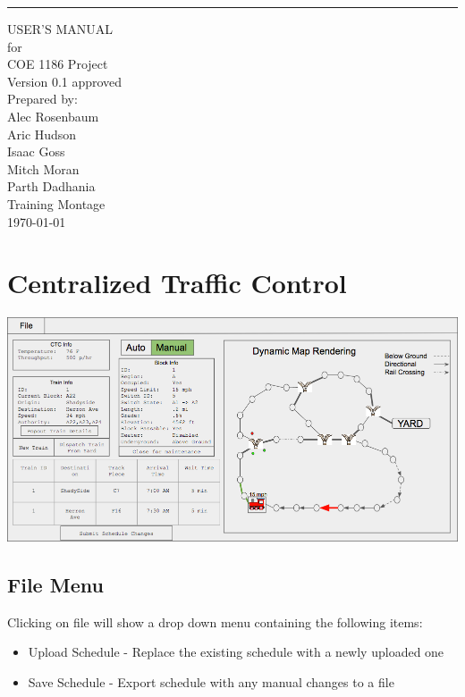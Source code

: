 \documentclass{scrreprt}
\date{}
\def\myversion{0.1 }
\begin{document}
\begin{flushright}
    \rule{16cm}{5pt}\vskip1cm
    \begin{bfseries}
        \Huge{USER'S MANUAL}\\
        \vspace{.9cm}
        for\\
        \vspace{.9cm}
        COE 1186 Project\\
        \vspace{.9cm}
        \LARGE{Version \myversion approved}\\
        \vspace{.9cm}
        Prepared by:\\
        Alec Rosenbaum\\
        Aric Hudson\\
        Isaac Goss\\
        Mitch Moran\\
        Parth Dadhania\\
        \vspace{1.9cm}
        Training Montage\\
        \vspace{.9cm}
        \today\\
    \end{bfseries}
\end{flushright}

\tableofcontents


\chapter{Centralized Traffic Control}

\includegraphics[width=\textwidth]{CTC-main}

\section{File Menu}
Clicking on file will show a drop down menu containing the following items:
\begin{itemize}
  \item Upload Schedule - Replace the existing schedule with a newly uploaded one
  \item Save Schedule - Export schedule with any manual changes to a file
\end{itemize}
\end{document}
